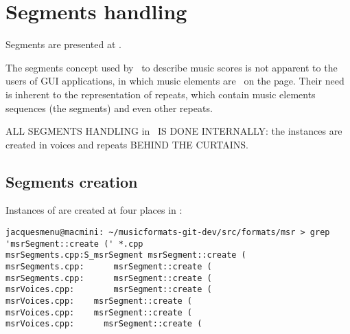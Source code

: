 



\chapter{Segments handling}\label{Segments handling}

Segments are presented at .

The segments concept used by \mf\ to describe music scores is not apparent to the users of GUI applications, in which music elements are \drawn\ on the page.
Their need is inherent to the representation of repeats, which contain music elements sequences (the segments) and even other repeats.

\MakeUppercase{All segments handling} in \mf\ \MakeUppercase{is done internally}: the  instances are created in voices and repeats \MakeUppercase{behind the curtains}.


\section{Segments creation}\label{Segments creation}

Instances of  are created at four places in :
\begin{lstlisting}[language=Terminal]
jacquesmenu@macmini: ~/musicformats-git-dev/src/formats/msr > grep 'msrSegment::create (' *.cpp
msrSegments.cpp:S_msrSegment msrSegment::create (
msrSegments.cpp:      msrSegment::create (
msrSegments.cpp:      msrSegment::create (
msrVoices.cpp:        msrSegment::create (
msrVoices.cpp:    msrSegment::create (
msrVoices.cpp:    msrSegment::create (
msrVoices.cpp:      msrSegment::create (
\end{lstlisting}

